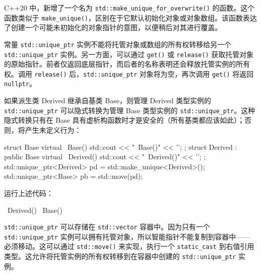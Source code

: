 C++20 中，新增了一个名为 \verb|std::make_unique_for_overwrite()| 的函数。这个函数类似于 \verb|make_unique()|，区别在于它默认初始化对象或对象数组。该函数表达了创建一个可能未初始化的对象指针的意图，以便稍后对其进行覆盖。

常量 \verb|std::unique_ptr| 实例不能将托管对象或数组的所有权转移给另一个 \verb|std::unique_ptr| 实例。另一方面，可以通过 \verb|get()| 或 \verb|release()| 获取托管对象的原始指针。前者仅返回底层指针，而后者的名称表明还会释放托管实例的所有权。调用 \verb|release()| 后，\verb|std::unique_ptr| 对象将为空，再次调用 \verb|get()| 将返回 \verb|nullptr|。

如果派生类 Derived 继承自基类 Base，则管理 Derived 类型实例的 \verb|std::unique_ptr| 可以隐式转换为管理 Base 类型实例的 \verb|std::unique_ptr|。这种隐式转换只有在 Base 具有虚析构函数时才是安全的（所有基类都应该如此）；否则，将产生未定义行为：

\begin{cpp}
struct Base
{
    virtual ~Base()
    {
        std::cout << "~Base()" << '\n';
    }
};
struct Derived : public Base
{
    virtual ~Derived()
    {
        std::cout << "~Derived()" << '\n';
    }
};
std::unique_ptr<Derived> pd = std::make_unique<Derived>();
std::unique_ptr<Base> pb = std::move(pd);
\end{cpp}

运行上述代码：

\begin{shell}
~Derived()
~Base()
\end{shell}

\verb|std::unique_ptr| 可以存储在 \verb|std::vector| 容器中。因为只有一个 \verb|std::unique_ptr| 实例可以拥有托管对象，所以智能指针不能复制到容器中——必须移动。这可以通过 \verb|std::move()| 来实现，执行一个 \verb|static_cast| 到右值引用类型。这允许将托管实例的所有权转移到在容器中创建的 \verb|std::unique_ptr| 实例。


